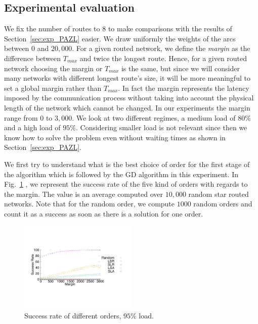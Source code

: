 \documentclass[10pt, conference, letterpaper]{IEEEtran}
\begin{document}
    \subsection{Experimental evaluation}
    \label{sec:resultsPALL}
    
    We fix the number of routes to $8$ to make comparisons with the results of Section~\ref{sec:exp_PAZL} easier. 
    We draw uniformly the weights of the arcs between $0$ and $20,000$.
    For a given routed network, we define the {\em margin} as the difference between $T_{max}$ and twice the longest route. 
    Hence, for a given routed network choosing the margin or $T_{max}$ is the same, but since we will consider many networks with different longest route's size, it will be more meaningful to set a global margin rather than $T_{max}$.
    In fact the margin represents the latency imposed by the communication process without taking into account the physical length of the network which cannot be changed. In our experiments the margin range from  $0$ to $3,000$.
   We look at two different regimes, a medium load of $80\%$ and a high load of $95\%$.
   Considering smaller load is not relevant since then we know how to solve the problem even without waiting times as shown in Section~\ref{sec:exp_PAZL}. 
   
   We first try to understand what is the best choice of order for the first stage of the algorithm which is followed by the GD algorithm in this experiment. In Fig.~\ref{fig:success95} , we represent the success rate of the five kind of orders with regards to the margin. The value is an average computed over $10,000$ random star routed networks.  Note that for the random order, we compute $1000$ random orders and count it as a success as soon as there is a solution for one order. 

\begin{figure}[h] 
  \centering
    \includegraphics[width=0.5\textwidth]{departs_gp_21000.pdf}
      \caption{Success rate of different orders, $95\%$ load.}
      \label{fig:success95}
          \end{figure}
\end{document}
